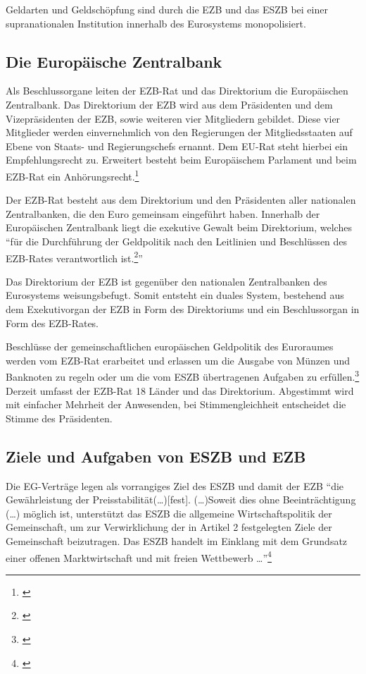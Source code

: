 \documentclass[
        onecolumn,
        a4paper,
        abstracton,
        parskip=half
        ,final
        ]{scrartcl}
\begin{document}
Geldarten und Geldsch{\"o}pfung sind durch die EZB und das ESZB bei einer supranationalen Institution innerhalb des Eurosystems monopolisiert.



\subsection{Die Europ{\"a}ische Zentralbank}
Als Beschlussorgane leiten der EZB-Rat und das Direktorium die Europ{\"a}ischen Zentralbank. Das Direktorium der \ac{EZB} wird aus dem Pr{\"a}sidenten und dem Vizepr{\"a}sidenten der EZB, sowie weiteren vier Mitgliedern gebildet. Diese vier Mitglieder werden einvernehmlich von den Regierungen der Mitgliedsstaaten auf Ebene von Staats- und Regierungschefs ernannt. Dem EU-Rat steht hierbei ein Empfehlungsrecht zu. Erweitert besteht beim Europ{\"a}ischem Parlament und beim EZB-Rat ein Anh{\"o}rungsrecht.\footnote[46]{\citep*[vgl.][S.553]{Basseler2010}}

Der EZB-Rat besteht aus dem Direktorium und den Pr{\"a}sidenten aller nationalen Zentralbanken, die den Euro gemeinsam eingef{\"u}hrt haben. Innerhalb der Europ{\"a}ischen Zentralbank liegt die exekutive Gewalt beim Direktorium, welches "`f{\"u}r die Durchf{\"u}hrung der Geldpolitik nach den Leitlinien und Beschl{\"u}ssen des EZB-Rates verantwortlich ist.\footnote[47]{\citep*[S.553]{Basseler2010}}"'

Das Direktorium der \ac{EZB} ist gegen{\"u}ber den nationalen Zentralbanken des Eurosystems weisungsbefugt. Somit entsteht ein duales System, bestehend aus dem Exekutivorgan der EZB in Form des Direktoriums und ein Beschlussorgan in Form des EZB-Rates.

Beschl{\"u}sse der gemeinschaftlichen europ{\"a}ischen Geldpolitik des Euroraumes werden vom EZB-Rat erarbeitet und erlassen um die Ausgabe von M{\"u}nzen und Banknoten zu regeln oder um die vom \ac{ESZB} {\"u}bertragenen Aufgaben zu erf{\"u}llen.\footnote[100]{\citep*[vgl.][S.553]{Basseler2010}}
Derzeit umfasst der EZB-Rat 18 L{\"a}nder und das Direktorium. Abgestimmt wird mit einfacher Mehrheit der Anwesenden, bei Stimmengleichheit entscheidet die Stimme des Pr{\"a}sidenten.


\subsection{Ziele und Aufgaben von ESZB und EZB}  %
Die EG-Vertr{\"a}ge legen als vorrangiges Ziel des \ac{ESZB} und damit der EZB "`die Gew{\"a}hrleistung der Preisstabilit{\"a}t(\ldots)[fest]. (\ldots)Soweit dies ohne Beeintr{\"a}chtigung  (\ldots) m{\"o}glich ist, unterst{\"u}tzt das ESZB die allgemeine Wirtschaftspolitik der Gemeinschaft, um zur Verwirklichung der in Artikel 2 festgelegten Ziele der Gemeinschaft beizutragen. Das ESZB handelt im Einklang mit dem Grundsatz einer offenen Marktwirtschaft und mit freien Wettbewerb \ldots"'\footnote[48]{\citep*[vgl.][S.554]{Basseler2010}}
\end{document}
